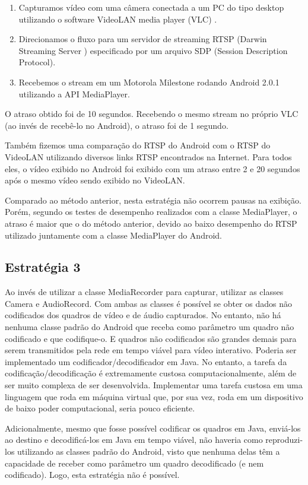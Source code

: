 \documentclass{acm_proc_article-sp}
\begin{document}
\begin{enumerate}
 \item Capturamos vídeo com uma câmera conectada a um PC do tipo desktop utilizando o software VideoLAN media player (VLC) \cite{VLC}.
 \item Direcionamos o fluxo para um servidor de streaming RTSP (Darwin Streaming Server \cite{DSS}) especificado por um arquivo SDP (Session Description Protocol).
 \item Recebemos o stream em um Motorola Milestone rodando Android 2.0.1 utilizando a API MediaPlayer.
\end{enumerate}

O atraso obtido foi de 10 segundos. Recebendo o mesmo stream no próprio VLC (ao invés de recebê-lo no Android), o atraso foi de 1 segundo.	 	 	

Também fizemos uma comparação do RTSP do Android com o RTSP do VideoLAN utilizando diversos links RTSP encontrados na Internet. Para todos eles, o vídeo exibido no Android foi exibido com um atraso entre 2 e 20 segundos após o mesmo vídeo sendo exibido no VideoLAN.

Comparado ao método anterior, nesta estratégia não ocorrem pausas na exibição. Porém, segundo os testes de desempenho realizados com a classe MediaPlayer, o atraso é maior que o do método anterior, devido ao baixo desempenho do RTSP utilizado juntamente com a classe MediaPlayer do Android.

\subsection{Estratégia 3}

Ao invés de utilizar a classe MediaRecorder para capturar, utilizar as classes Camera e AudioRecord. Com ambas as classes é possível se obter os dados não codificados dos quadros de vídeo e de áudio capturados. No entanto, não há nenhuma classe padrão do Android que receba como parâmetro um quadro não codificado e que codifique-o. E quadros não codificados são grandes demais para serem transmitidos pela rede em tempo viável para vídeo interativo. Poderia ser implementado um codificador/decodificador em Java. No entanto, a tarefa da codificação/decodificação é extremamente custosa computacionalmente, além de ser muito complexa de ser desenvolvida. Implementar uma tarefa custosa em uma linguagem que roda em máquina virtual que, por sua vez, roda em um dispositivo de baixo poder computacional, seria pouco eficiente.

Adicionalmente, mesmo que fosse possível codificar os quadros em Java, enviá-los ao destino e decodificá-los em Java em tempo viável, não haveria como reproduzi-los utilizando as classes padrão do Android, visto que nenhuma delas têm a capacidade de receber como parâmetro um quadro decodificado (e nem codificado). Logo, esta estratégia não é possível.
\end{document}
